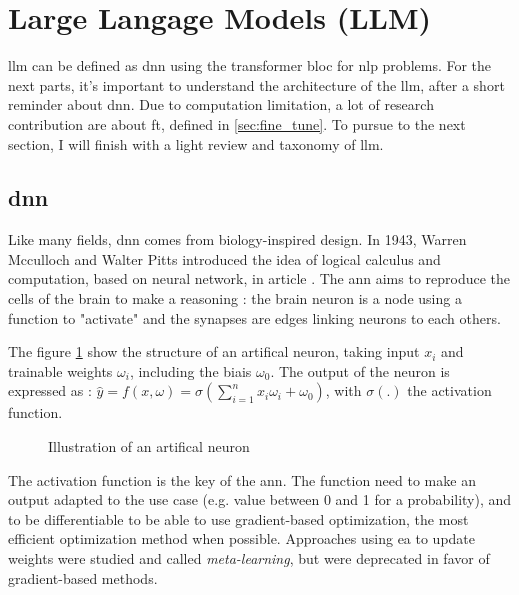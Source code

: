 \section{Large Langage Models (LLM)}
\label{sec:llm}
\acrshort{llm} can be defined as \acrfull{dnn} using the \Gls{transformer} bloc for \acrfull{nlp} problems. For the next parts, it's important to understand the architecture of the \acrshort{llm}, after a short reminder about \acrshort{dnn}. Due to computation limitation, a lot of research contribution are about \Gls{ft}, defined in \ref{sec:fine_tune}. To pursue to the next section, I will finish with a light review and taxonomy of \acrshort{llm}. 

\subsection{\acrfull{dnn}}
\label{sec:dnn}
Like many fields, \acrshort{dnn} comes from biology-inspired design. In 1943,  Warren Mcculloch and Walter Pitts introduced the idea of logical calculus and computation, based on neural network, in article \cite{mcculloch_logical_1943}. The \acrfull{ann} aims to reproduce the cells of the brain to make a reasoning : the brain neuron is a node using a function to "activate" and the synapses are edges linking neurons to each others.  


The figure \ref{fig:artifical_neuron} show the structure of an artifical neuron, taking input $x_i$ and trainable weights $\omega_i$, including the biais $\omega_0$. The output of the neuron is expressed as : $\hat{y} = f(x,\omega) =  \sigma(\sum_{i=1}^n x_i \omega_i +\omega_0)$, with $\sigma(.)$ the activation function.

\begin{figure}[h]
    \centering
    
    \caption{Illustration of an artifical neuron}
    \label{fig:artifical_neuron}
\end{figure}


The activation function is the key of the \acrshort{ann}. The function need to make an output adapted to the use case (e.g. value between 0 and 1 for a probability), and to be differentiable to be able to use gradient-based optimization, the most efficient optimization method when possible. Approaches using \acrfull{ea} to update weights were studied and called \textit{meta-learning}\cite{hospedales_meta-learning_2022}, but were deprecated in favor of gradient-based methods. 

